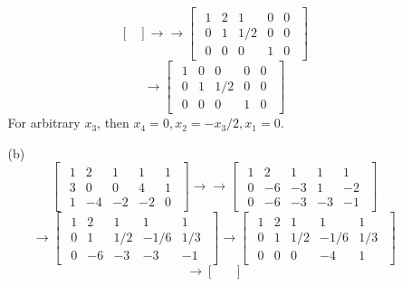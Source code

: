 \documentclass[openany]{book}
\begin{document}
\begin{itemize}
\begin{itemize}
$$\begin{bmatrix}
\end{bmatrix}\rightarrow\rightarrow \begin{bmatrix}
\begin{array}{cccc|c}
1 & 2 & 1 & 0 & 0 \\
0 & 1 & 1/2 & 0 & 0 \\
0 & 0 & 0 & 1 & 0
\end{array}
\end{bmatrix}$$
$$\rightarrow \begin{bmatrix}
\begin{array}{cccc|c}
1 & 0 & 0 & 0 & 0 \\
0 & 1 & 1/2 & 0 & 0 \\
0 & 0 & 0 & 1 & 0
\end{array}
\end{bmatrix}$$
For arbitrary $x_3$, then $x_4 = 0, x_2 = -x_3/2, x_1 = 0$.
\item[(b)]
$$\begin{bmatrix}
\begin{array}{cccc|c}
1 & 2 & 1 & 1 & 1 \\
3 & 0 & 0 & 4 & 1 \\
1 & -4 & -2 & -2 & 0
\end{array}
\end{bmatrix} \rightarrow\rightarrow \begin{bmatrix}
\begin{array}{cccc|c}
1 & 2 & 1 & 1 & 1 \\
0 & -6 & -3 & 1 & -2 \\
0 & -6 & -3 & -3 & -1
\end{array}
\end{bmatrix}$$
$$ \rightarrow \begin{bmatrix}
\begin{array}{cccc|c}
1 & 2 & 1 & 1 & 1 \\
0 & 1 & 1/2 & -1/6 & 1/3 \\
0 & -6 & -3 & -3 & -1
\end{array}
\end{bmatrix} \rightarrow \begin{bmatrix}
\begin{array}{cccc|c}
1 & 2 & 1 & 1 & 1 \\
0 & 1 & 1/2 & -1/6 & 1/3 \\
0 & 0 & 0 & -4 & 1
\end{array}
\end{bmatrix}$$
$$\rightarrow \begin{bmatrix}
\begin{array}{cccc|c}

\end{array}
\end{bmatrix}$$
\end{itemize}
\end{itemize}
\end{document}
